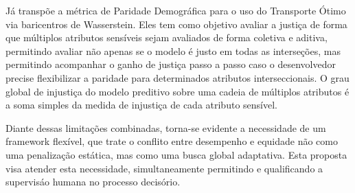 Já \citet{hu2024sequentially} transpõe a métrica de Paridade Demográfica para o uso do Transporte Ótimo via baricentros de Wasserstein. Eles tem como objetivo avaliar a justiça de forma que múltiplos atributos sensíveis sejam avaliados de forma coletiva e aditiva, permitindo avaliar não apenas se o modelo é justo em todas as interseções, mas permitindo acompanhar o ganho de justiça passo a passo caso o desenvolvedor precise flexibilizar a paridade para determinados atributos interseccionais. O grau global de injustiça do modelo preditivo sobre uma cadeia de múltiplos atributos é a soma simples da medida de injustiça de cada atributo sensível.

Diante dessas limitações combinadas, torna-se evidente a necessidade de um framework flexível, que trate o conflito entre desempenho e equidade não como uma penalização estática, mas como uma busca global adaptativa. Esta proposta visa atender esta necessidade, simultaneamente permitindo e qualificando a supervisáo humana no processo decisório.
